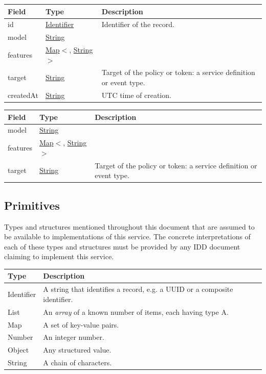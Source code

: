 \documentclass[a4paper]{arrowhead}
\newcommand{\pdef}[1]{{\textcolor{ArrowheadGrey}{#1\label{sec:model:primitives:#1}\label{sec:model:primitives:#1s}\label{sec:model:primitives:#1es}}}}
\newcommand{\pref}[1]{{\textcolor{ArrowheadGrey}{\hyperref[sec:model:primitives:#1]{#1}}}}
\begin{document}
\noindent\begin{tabularx}{\textwidth}{| >{\raggedright\arraybackslash}p{3.9cm} | >{\raggedright\arraybackslash\small}p{5.3cm} | X |} \hline
\rowcolor{gray!33} Field & Type & Description \\ \hline
id & \pref{Identifier} & Identifier of the record. \\ \hline
model & \pref{String} &  \\ \hline
features & \pref{Map}$<$\allowbreak{}\pref{String}, \pref{String}$>$ &  \\ \hline
target & \pref{String} & Target of the policy or token: a service definition or event type. \\ \hline
created\allowbreak{}At & \pref{String} & UTC time of creation. \\ \hline
\end{tabularx}







\noindent\begin{tabularx}{\textwidth}{| >{\raggedright\arraybackslash}p{3.9cm} | >{\raggedright\arraybackslash\small}p{5.3cm} | X |} \hline
\rowcolor{gray!33} Field & Type & Description \\ \hline
model & \pref{String} &  \\ \hline
features & \pref{Map}$<$\allowbreak{}\pref{String}, \pref{String}$>$ &  \\ \hline
target & \pref{String} & Target of the policy or token: a service definition or event type. \\ \hline
\end{tabularx}



\subsection{Primitives}
\label{sec:model:primitives}

Types and structures mentioned throughout this document that are assumed to be available to implementations of this service.
The concrete interpretations of each of these types and structures must be provided by any IDD document claiming to implement this service.

\noindent\begin{tabularx}{\textwidth}{| p{4.6cm} | X |} \hline
\rowcolor{gray!33} Type & Description \\ \hline
\pdef{Identifier} & A string that identifies a record, e.g. a UUID or a composite identifier. \\ \hline
\pdef{List} & An \textit{array} of a known number of items, each having type A. \\ \hline
\pdef{Map} & A set of key-value pairs. \\ \hline
\pdef{Number} & An integer number. \\ \hline
\pdef{Object} & Any structured value. \\ \hline
\pdef{String} & A chain of characters. \\ \hline
\end{tabularx}
\end{document}
